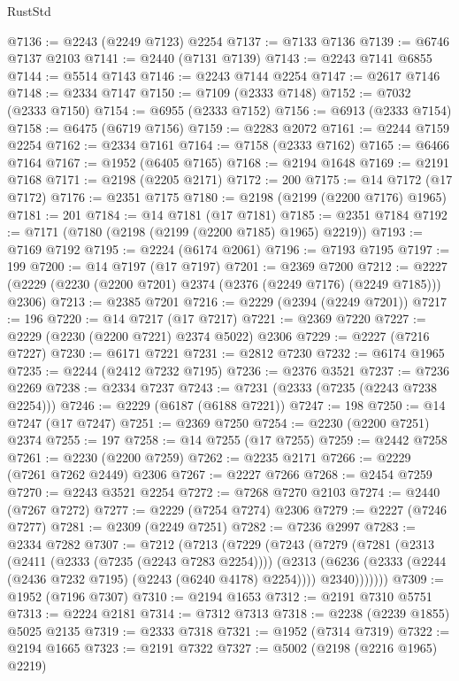 \begin{lexlean}{RustStd}
\begin{coremodule}
@7136 := @2243 (@2249 @7123) @2254
@7137 := @7133 @7136
@7139 := @6746 @7137 @2103
@7141 := @2440 (@7131 @7139)
@7143 := @2243 @7141 @6855
@7144 := @5514 @7143
@7146 := @2243 @7144 @2254
@7147 := @2617 @7146
@7148 := @2334 @7147
@7150 := @7109 (@2333 @7148)
@7152 := @7032 (@2333 @7150)
@7154 := @6955 (@2333 @7152)
@7156 := @6913 (@2333 @7154)
@7158 := @6475 (@6719 @7156)
@7159 := @2283 @2072
@7161 := @2244 @7159 @2254
@7162 := @2334 @7161
@7164 := @7158 (@2333 @7162)
@7165 := @6466 @7164
@7167 := @1952 (@6405 @7165)
@7168 := @2194 @1648
@7169 := @2191 @7168
@7171 := @2198 (@2205 @2171)
@7172 := 200
@7175 := @14 @7172 (@17 @7172)
@7176 := @2351 @7175
@7180 := @2198 (@2199 (@2200 @7176) @1965)
@7181 := 201
@7184 := @14 @7181 (@17 @7181)
@7185 := @2351 @7184
@7192 := @7171 (@7180 (@2198 (@2199 (@2200 @7185) @1965) @2219))
@7193 := @7169 @7192
@7195 := @2224 (@6174 @2061)
@7196 := @7193 @7195
@7197 := 199
@7200 := @14 @7197 (@17 @7197)
@7201 := @2369 @7200
@7212 := @2227 (@2229 (@2230 (@2200 @7201) @2374 (@2376 (@2249 @7176) (@2249 @7185))) @2306)
@7213 := @2385 @7201
@7216 := @2229 (@2394 (@2249 @7201))
@7217 := 196
@7220 := @14 @7217 (@17 @7217)
@7221 := @2369 @7220
@7227 := @2229 (@2230 (@2200 @7221) @2374 @5022) @2306
@7229 := @2227 (@7216 @7227)
@7230 := @6171 @7221
@7231 := @2812 @7230
@7232 := @6174 @1965
@7235 := @2244 (@2412 @7232 @7195)
@7236 := @2376 @3521
@7237 := @7236 @2269
@7238 := @2334 @7237
@7243 := @7231 (@2333 (@7235 (@2243 @7238 @2254)))
@7246 := @2229 (@6187 (@6188 @7221))
@7247 := 198
@7250 := @14 @7247 (@17 @7247)
@7251 := @2369 @7250
@7254 := @2230 (@2200 @7251) @2374
@7255 := 197
@7258 := @14 @7255 (@17 @7255)
@7259 := @2442 @7258
@7261 := @2230 (@2200 @7259)
@7262 := @2235 @2171
@7266 := @2229 (@7261 @7262 @2449) @2306
@7267 := @2227 @7266
@7268 := @2454 @7259
@7270 := @2243 @3521 @2254
@7272 := @7268 @7270 @2103
@7274 := @2440 (@7267 @7272)
@7277 := @2229 (@7254 @7274) @2306
@7279 := @2227 (@7246 @7277)
@7281 := @2309 (@2249 @7251)
@7282 := @7236 @2997
@7283 := @2334 @7282
@7307 := @7212
    (@7213
      (@7229
        (@7243
          (@7279
            (@7281
              (@2313
                (@2411 (@2333 (@7235 (@2243 @7283 @2254))))
                (@2313
                  (@6236 (@2333 (@2244 (@2436 @7232 @7195) (@2243 (@6240 @4178) @2254))))
                  @2340)))))))
@7309 := @1952 (@7196 @7307)
@7310 := @2194 @1653
@7312 := @2191 @7310 @5751
@7313 := @2224 @2181
@7314 := @7312 @7313
@7318 := @2238 (@2239 @1855) @5025 @2135
@7319 := @2333 @7318
@7321 := @1952 (@7314 @7319)
@7322 := @2194 @1665
@7323 := @2191 @7322
@7327 := @5002 (@2198 (@2216 @1965) @2219)

\end{coremodule}
\end{lexlean}
